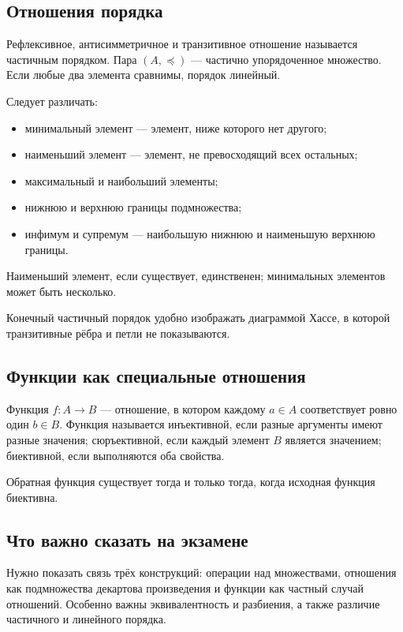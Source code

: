 \subsection{Отношения порядка}

Рефлексивное, антисимметричное и транзитивное отношение называется частичным
порядком. Пара $(A,\preceq)$ --- частично упорядоченное множество.
Если любые два элемента сравнимы, порядок линейный.

Следует различать:
\begin{itemize}
    \item минимальный элемент --- элемент, ниже которого нет другого;
    \item наименьший элемент --- элемент, не превосходящий всех остальных;
    \item максимальный и наибольший элементы;
    \item нижнюю и верхнюю границы подмножества;
    \item инфимум и супремум --- наибольшую нижнюю и наименьшую верхнюю границы.
\end{itemize}
Наименьший элемент, если существует, единственен; минимальных элементов может
быть несколько.

Конечный частичный порядок удобно изображать диаграммой Хассе, в которой
транзитивные рёбра и петли не показываются.

\subsection{Функции как специальные отношения}

Функция $f\colon A\to B$ --- отношение, в котором каждому $a\in A$ соответствует
ровно один $b\in B$. Функция называется инъективной, если разные аргументы имеют
разные значения; сюръективной, если каждый элемент $B$ является значением;
биективной, если выполняются оба свойства.

Обратная функция существует тогда и только тогда, когда исходная функция
биективна.

\subsection{Что важно сказать на экзамене}

Нужно показать связь трёх конструкций: операции над множествами, отношения как
подмножества декартова произведения и функции как частный случай отношений.
Особенно важны эквивалентность и разбиения, а также различие частичного и
линейного порядка.

\newpage
